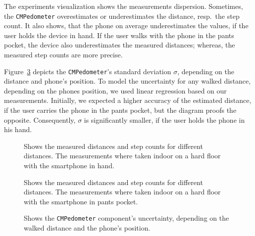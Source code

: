 The experiments visualization shows the measurements dispersion. Sometimes, the \texttt{CMPedometer} overestimates or underestimates the distance, resp.\ the step count. It also shows, that the phone on average underestimates the values, if the user holds the device in hand. If the user walks with the phone in the pants pocket, the device also underestimates the measured distances; whereas, the measured step counts are more precise.

Figure~\ref{fig:eval:pedometerNDF} depicts the \texttt{CMPedometer}'s standard deviation $\sigma$, depending on the distance and phone's position. To model the uncertainty for any walked distance, depending on the phones position, we used linear regression based on our measurements. Initially, we expected a higher accuracy of the estimated distance, if the user carries the phone in the pants pocket, but the diagram proofs the opposite. Consequently, $\sigma$ is significantly smaller, if the user holds the phone in his hand.


\begin{figure}
      
	\caption{Shows the measured distances and step counts for different distances. The measurements where taken indoor on a hard floor with the smartphone in hand.}
	\label{fig:eval:pedometerHand}
\end{figure}

\begin{figure}
  
  \caption{Shows the measured distances and step counts for different distances. The measurements where taken indoor on a hard floor with the smartphone in pants pocket.}
  \label{fig:eval:pedometerPocket}
\end{figure}

\begin{figure}
  
  \caption {Shows the \texttt{CMPedometer} component's uncertainty, depending on the walked distance and the phone's position.}
  \label{fig:eval:pedometerNDF}
\end{figure}


